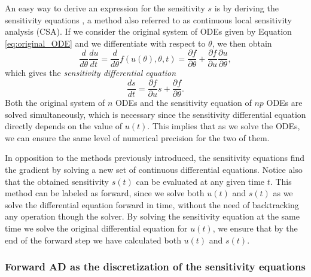 An easy way to derive an expression for the sensitivity $s$ is by deriving the sensitivity equations \cite{ramsay2017dynamic}, a method also referred to as continuous local sensitivity analysis (CSA). 
If we consider the original system of ODEs given by Equation \eqref{eq:original_ODE} and we differentiate with respect to $\theta$, we then obtain
\begin{equation}
 \frac{d}{d\theta} \frac{du}{dt} 
 =
 \frac{d}{d\theta} f(u(\theta), \theta, t)
 = 
 \frac{\partial f}{\partial \theta}
 + 
 \frac{\partial f}{\partial u} \frac{\partial u}{\partial \theta},
\end{equation}
which gives the \textit{sensitivity differential equation} 
\begin{equation}
 \frac{ds}{dt} = \frac{\partial f}{\partial u} s + \frac{\partial f}{\partial \theta}.
 \label{eq:sensitivity_equations}
\end{equation}
Both the original system of $n$ ODEs and the sensitivity equation of $np$ ODEs are solved simultaneously, which is necessary since the sensitivity differential equation directly depends on the value of $u(t)$.  
This implies that as we solve the ODEs, we can ensure the same level of numerical precision for the two of them.

In opposition to the methods previously introduced, the sensitivity equations find the gradient by solving a new set of continuous differential equations.
Notice also that the obtained sensitivity $s(t)$ can be evaluated at any given time $t$. 
This method can be labeled as forward, since we solve both $u(t)$ and $s(t)$ as we solve the differential equation forward in time, without the need of backtracking any operation though the solver.
By solving the sensitivity equation at the same time we solve the original differential equation for $u(t)$, we ensure that by the end of the forward step we have calculated both $u(t)$ and $s(t)$. 

\subsubsection{Forward AD as the discretization of the sensitivity equations}


